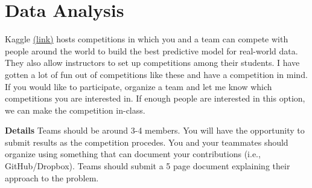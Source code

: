 \documentclass[11pt]{article}
\begin{document}
\section{Data Analysis}

Kaggle \href{https://www.kaggle.com}{(link)} hosts competitions in which you and a team can compete with people around the world to build the best predictive model for real-world data. 
They also allow instructors to set up competitions among their students.
I have gotten a lot of fun out of competitions like these and have a competition in mind.
If you would like to participate, organize a team and let me know which competitions you are interested in. If enough people are interested in this option, we can make the competition in-class.

\textbf{Details} 
Teams should be around 3-4 members. You will have the opportunity to submit results as the competition procedes. 
You and your teammates should organize using something that can document your contributions (i.e., GitHub/Dropbox).
Teams should submit a 5 page document explaining their approach to the problem.
\end{document}
